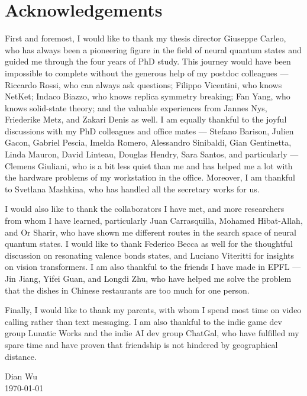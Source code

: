 \chapter*{Acknowledgements}

First and foremost, I would like to thank my thesis director Giuseppe Carleo, who has always been a pioneering figure in the field of neural quantum states and guided me through the four years of PhD study.
This journey would have been impossible to complete without the generous help of my postdoc colleagues --- Riccardo Rossi, who can always ask questions; Filippo Vicentini, who knows NetKet; Indaco Biazzo, who knows replica symmetry breaking; Fan Yang, who knows solid-state theory; and the valuable experiences from Jannes Nys, Friederike Metz, and Zakari Denis as well.
I am equally thankful to the joyful discussions with my PhD colleagues and office mates --- Stefano Barison, Julien Gacon, Gabriel Pescia, Imelda Romero, Alessandro Sinibaldi, Gian Gentinetta, Linda Mauron, David Linteau, Douglas Hendry, Sara Santos, and particularly --- Clemens Giuliani, who is a bit less quiet than me and has helped me a lot with the hardware problems of my workstation in the office.
Moreover, I am thankful to Svetlana Mashkina, who has handled all the secretary works for us.

I would also like to thank the collaborators I have met, and more researchers from whom I have learned, particularly Juan Carrasquilla, Mohamed Hibat-Allah, and Or Sharir, who have shown me different routes in the search space of neural quantum states. I would like to thank Federico Becca as well for the thoughtful discussion on resonating valence bonds states, and Luciano Viteritti for insights on vision transformers. I am also thankful to the friends I have made in EPFL --- Jin Jiang, Yifei Guan, and Longdi Zhu, who have helped me solve the problem that the dishes in Chinese restaurants are too much for one person.

Finally, I would like to thank my parents, with whom I spend most time on video calling rather than text messaging. I am also thankful to the indie game dev group Lunatic Works and the indie AI dev group ChatGal, who have fulfilled my spare time and have proven that friendship is not hindered by geographical distance.

\begin{flushright}
Dian Wu \\
\today
\end{flushright}
